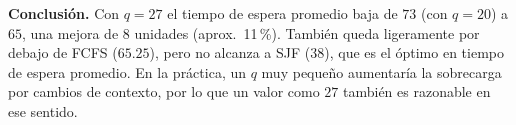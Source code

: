 \documentclass[a4paper, 11pt]{article}
\begin{document}
\begin{enumerate}
{        \textbf{Conclusión.} Con $q=27$ el tiempo de espera promedio baja de $73$ (con $q=20$) a $65$, una mejora de 8 unidades (aprox.\ 11\,\%). También queda ligeramente por debajo de FCFS ($65.25$), pero no alcanza a SJF ($38$), que es el óptimo en tiempo de espera promedio. En la práctica, un $q$ muy pequeño aumentaría la sobrecarga por cambios de contexto, por lo que un valor como $27$ también es razonable en ese sentido.

        }
\end{enumerate}
\end{document}
